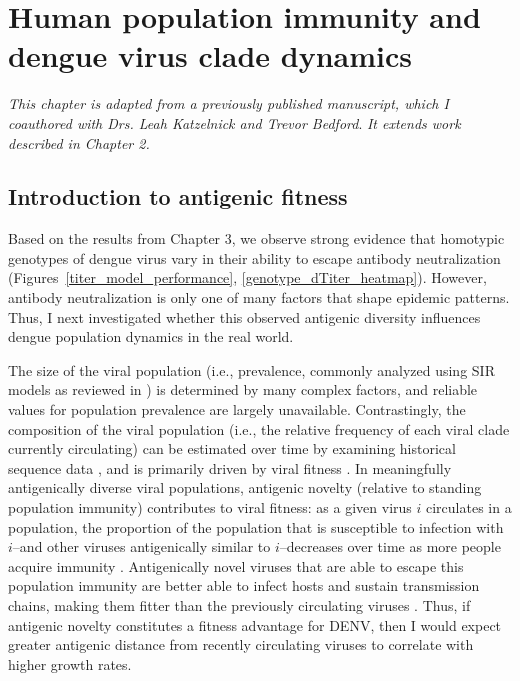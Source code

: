 
\chapter{Human population immunity and dengue virus clade dynamics}
\textit{This chapter is adapted from a previously published manuscript, which I coauthored with Drs. Leah Katzelnick and Trevor Bedford}\citep{bell2018dengue}. \textit{It extends work described in Chapter 2.}

\section{Introduction to antigenic fitness}
Based on the results from Chapter 3, we observe strong evidence that homotypic genotypes of dengue virus vary in their ability to escape antibody neutralization (Figures~\ref{titer_model_performance}, \ref{genotype_dTiter_heatmap}).
However, antibody neutralization is only one of many factors that shape epidemic patterns.
Thus, I next investigated whether this observed antigenic diversity influences dengue population dynamics in the real world.

The size of the viral population (i.e., prevalence, commonly analyzed using SIR models as reviewed in \citep{lourencco2018challenges}) is determined by many complex factors, and reliable values for population prevalence are largely unavailable.
Contrastingly, the composition of the viral population (i.e., the relative frequency of each viral clade currently circulating) can be estimated over time by examining historical sequence data \citep{lee2018deep,neher2016prediction}, and is primarily driven by viral fitness \citep{bedford2011strength}.
In meaningfully antigenically diverse viral populations, antigenic novelty (relative to standing population immunity) contributes to viral fitness: as a given virus $i$ circulates in a population, the proportion of the population that is susceptible to infection with $i$--and other viruses antigenically similar to $i$--decreases over time as more people acquire immunity \citep{bedford2012canalization, luksza2014predictive}.
Antigenically novel viruses that are able to escape this population immunity are better able to infect hosts and sustain transmission chains, making them fitter than the previously circulating viruses \citep{zhang2005clade, bedford2012canalization}.
Thus, if antigenic novelty constitutes a fitness advantage for DENV, then I would expect greater antigenic distance from recently circulating viruses to correlate with higher growth rates.

